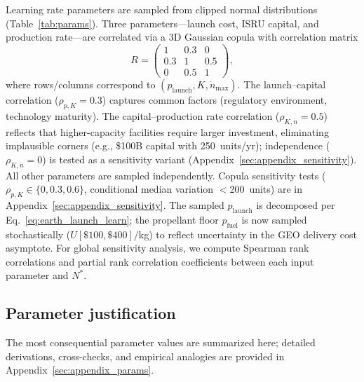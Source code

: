 \documentclass[preprint,12pt]{elsarticle}
\begin{document}
Learning rate parameters are sampled from clipped normal distributions (Table~\ref{tab:params}). Three parameters---launch cost, ISRU capital, and production rate---are correlated via a 3D Gaussian copula with correlation matrix
\begin{equation}
  R = \begin{pmatrix} 1 & 0.3 & 0 \\ 0.3 & 1 & 0.5 \\ 0 & 0.5 & 1 \end{pmatrix},
  \label{eq:copula_matrix}
\end{equation}
where rows/columns correspond to $(p_{\mathrm{launch}}, K, \dot{n}_{\max})$. The launch--capital correlation ($\rho_{p,K} = 0.3$) captures common factors (regulatory environment, technology maturity). The capital--production rate correlation ($\rho_{K,\dot{n}} = 0.5$) reflects that higher-capacity facilities require larger investment, eliminating implausible corners (e.g., \$100B capital with 250~units/yr); independence ($\rho_{K,\dot{n}} = 0$) is tested as a sensitivity variant (Appendix~\ref{sec:appendix_sensitivity}). All other parameters are sampled independently. Copula sensitivity tests ($\rho_{p,K} \in \{0, 0.3, 0.6\}$, conditional median variation $<$200~units) are in Appendix~\ref{sec:appendix_sensitivity}. The sampled $p_{\mathrm{launch}}$ is decomposed per Eq.~\ref{eq:earth_launch_learn}; the propellant floor $p_{\mathrm{fuel}}$ is now sampled stochastically ($U[\$100, \$400]$/kg) to reflect uncertainty in the GEO delivery cost asymptote. For global sensitivity analysis, we compute Spearman rank correlations and partial rank correlation coefficients between each input parameter and $N^*$.

\subsection{Parameter justification}
\label{sec:param_justification}

The most consequential parameter values are summarized here; detailed derivations, cross-checks, and empirical analogies are provided in Appendix~\ref{sec:appendix_params}.
\end{document}
